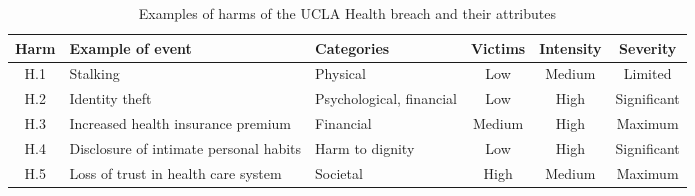 \begin{table}[h!]
    \caption{Examples of harms of the UCLA Health breach and their attributes}
    \label{harm_table}
    \centering

    \begin{tabular}{c|M{4cm}|M{3cm}|c|c|c}
    \hline
        Harm & Example of event & Categories & Victims & Intensity & Severity\\
    \hline
        H.1 & Stalking & Physical & Low & Medium & Limited\\
        H.2 & Identity theft & Psychological, financial & Low & High & Significant\\
        H.3 & Increased health insurance premium & Financial & Medium & High & Maximum\\
        H.4 & Disclosure of intimate personal habits & Harm to dignity & Low & High & Significant\\
        H.5 & Loss of trust in health care system & Societal & High & Medium & Maximum\\
    \hline
    \end{tabular}
\end{table}
